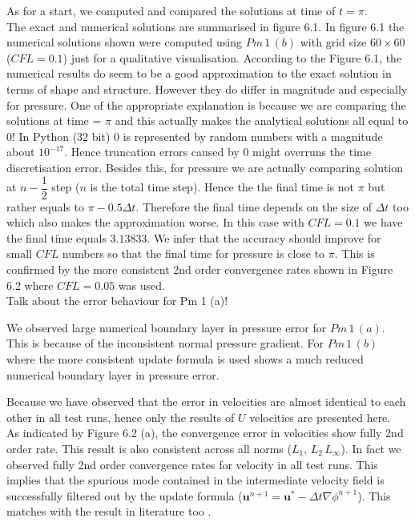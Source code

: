 As for a start, we computed and compared the solutions at time of $t = \pi$.\\
The exact and numerical solutions are summarised in figure 6.1. In figure 6.1 the numerical solutions shown were computed using $Pm\,1\,(b)$ with grid size $60 \times 60$ ($CFL = 0.1$) just for a qualitative visualisation. According to the Figure 6.1, the numerical results do seem to be a good approximation to the exact solution in terms of shape and structure. However they do differ in magnitude and especially for pressure. One of the appropriate explanation is because we are comparing the solutions at time = $\pi$ and this actually makes the analytical solutions all equal to 0! In Python (32 bit) 0 is represented by random numbers with a magnitude about $10^{-17}$. Hence truncation errors caused by 0 might overruns the time discretisation error. Besides this, for pressure we are actually comparing solution at $n-\dfrac{1}{2}$ step ($n$ is the total time step). Hence the the final time is not $\pi$ but rather equals to $\pi - 0.5\Delta t$. Therefore the final time depends on the size of $\Delta t$ too which also makes the approximation worse. In this case with $CFL = 0.1$ we have the final time equals $3.13833$. We infer that the accuracy should improve for small $CFL$ numbers so that the final time for pressure is close to $\pi$. This is confirmed by the more consistent 2nd order convergence rates shown in Figure 6.2 where $CFL = 0.05$ was used.\\
Talk about the error behaviour for Pm 1 (a)!

We observed large numerical boundary layer in pressure error for $Pm\,1\,(a)$. This is because of the inconsistent normal pressure gradient. For $Pm\,1\,(b)$ where the more consistent update formula is used shows a much reduced numerical boundary layer in pressure error.

Because we have observed that the error in velocities are almost identical to each other in all test runs, hence only the results of $U$ velocities are presented here.\\
As indicated by Figure 6.2 (a), the convergence error in velocities show fully 2nd order rate. This result is also consistent across all norms ($L_1,\,L_2\,L_\infty$). In fact we observed fully 2nd order convergence rates for velocity in all test runs. This implies that the spurious mode contained in the intermediate velocity field is successfully filtered out by the update formula ($\textbf{u}^{n+1} = \textbf{u}^* - \Delta t \nabla \phi^{n+1}$). This matches with the result in literature too \cite{brown2001accurate,guermond2004error,guermond2006overview}.\\

